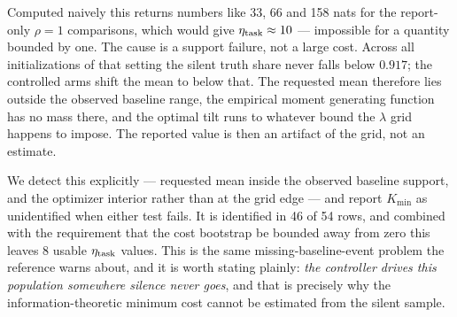 \documentclass[11pt]{article}
\begin{document}
Computed naively this returns numbers like 33, 66 and 158 nats for the report-only
$\rho=1$ comparisons, which would give $\eta_{\rm task}\approx10$ --- impossible for a
quantity bounded by one. The cause is a support failure, not a large cost. Across all
initializations of that setting the silent truth share never falls below $0.917$; the
controlled arms shift the mean to below that. The requested mean therefore lies outside the
observed baseline range, the empirical moment generating function has no mass there, and the
optimal tilt runs to whatever bound the $\lambda$ grid happens to impose. The reported value
is then an artifact of the grid, not an estimate.

We detect this explicitly --- requested mean inside the observed baseline support, and the
optimizer interior rather than at the grid edge --- and report $K_{\min}$ as unidentified
when either test fails. It is identified in 46 of 54 rows, and
combined with the requirement that the cost bootstrap be bounded away from zero this leaves
8 usable $\eta_{\rm task}$ values. This is the same missing-baseline-event
problem the reference warns about, and it is worth stating plainly: \emph{the controller
drives this population somewhere silence never goes}, and that is precisely why the
information-theoretic minimum cost cannot be estimated from the silent sample.
\end{document}
